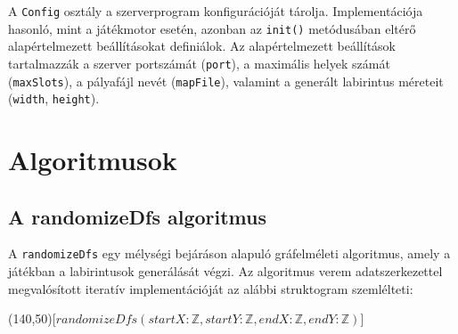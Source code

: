A \verb|Config| osztály a szerverprogram konfigurációját tárolja. Implementációja hasonló, mint a játékmotor esetén, azonban az \verb|init()| metódusában eltérő alapértelmezett beállításokat definiálok. Az alapértelmezett beállítások tartalmazzák a szerver portszámát (\verb|port|), a maximális helyek számát (\verb|maxSlots|), a pályafájl nevét (\verb|mapFile|), valamint a generált labirintus méreteit (\verb|width|, \verb|height|).

\newpage

\section{Algoritmusok} %

\subsection{A randomizeDfs algoritmus}

A \verb|randomizeDfs| egy mélységi bejáráson alapuló gráfelméleti algoritmus, amely a játékban a labirintusok generálását végzi. Az algoritmus verem adatszerkezettel megvalósított iteratív implementációját az alábbi struktogram szemlélteti:

\vspace{5mm}

\begin{struktogramm}(140,50)[\(randomizeDfs(startX: \mathbb{Z}, startY: \mathbb{Z}, endX: \mathbb{Z}, endY: \mathbb{Z})\)]
			\caseend
		\change
		\ifend
		\change
		\ifend
	\whileend
\end{struktogramm}


